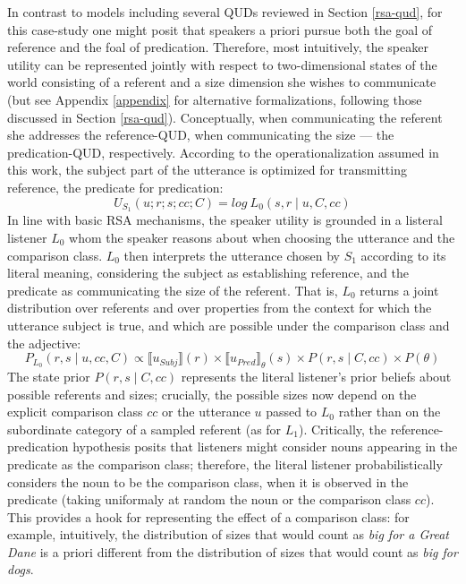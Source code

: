 In contrast to models including several QUDs reviewed in Section \ref{rsa-qud}, for this case-study one might posit that speakers a priori pursue both the goal of reference and the foal of predication. Therefore, most intuitively, the speaker utility can be represented jointly with respect to two-dimensional states of the world consisting of a referent and a size dimension she wishes to communicate (but see Appendix \ref{appendix} for alternative formalizations, following those discussed in Section \ref{rsa-qud}). Conceptually, when communicating the referent she addresses the reference-QUD, when communicating the size --- the predication-QUD, respectively. According to the operationalization assumed in this work, the subject part of the utterance is optimized for transmitting reference, the predicate for predication: 
\begin{equation}
\label{model1}
U_{S_1} (u; r; s; cc; C) = log \: L_0 (s, r \mid u, C, cc) 
\end{equation}
In line with basic RSA mechanisms, the speaker utility is grounded in a listeral listener $L_0$ whom the speaker reasons about when choosing the utterance and the comparison class. 
$L_0$ then interprets the utterance chosen by $S_1$ according to its literal meaning, considering the subject as establishing reference, and the predicate as communicating the size of the referent. 
That is, $L_0$ returns a joint distribution over referents and over properties from the context for which the utterance subject is true, and which are possible under the comparison class and the adjective: %
\begin{equation}
P_{L_0} (r, s \mid u, cc, C) \propto \llbracket u_{Subj} \rrbracket (r)  \times  \llbracket u_{Pred} \rrbracket_{\theta} (s) \times P(r, s \mid C, cc) \times P(\theta)
\end{equation}
The state prior $P(r, s \mid C, cc)$ represents the literal listener's prior beliefs about possible referents and sizes; crucially, the possible sizes now depend on the explicit comparison class $cc$ or the utterance $u$ passed to $L_0$ rather than on the subordinate category of a sampled referent (as for $L_1$). Critically, the reference-predication hypothesis posits that listeners might consider nouns appearing in the predicate as the comparison class; therefore, the literal listener probabilistically considers the noun to be the comparison class, when it is observed in the predicate (taking uniformaly at random the noun or the comparison class $cc$). This provides a hook for representing the effect of a comparison class: for example, intuitively, the distribution of sizes that would count as \emph{big for a Great Dane} is a priori different from the distribution of sizes that would count as \emph{big for dogs}. 

